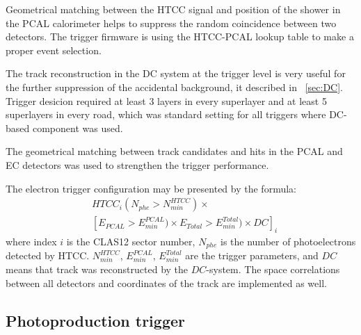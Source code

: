 Geometrical matching between the HTCC signal and position of the shower in the PCAL calorimeter helps to suppress the
random coincidence between two detectors. The trigger firmware is using the HTCC-PCAL lookup table to make a proper event selection.   

The track reconstruction in the DC system at the trigger level is very useful for the further suppression of the accidental background, it described in ~\ref{sec:DC}. Trigger desicion required at least 3 layers in every superlayer and at least 5 superlayers in every road, which was standard setting for all triggers where DC-based component was used.

The geometrical matching between track candidates and hits in the PCAL and EC detectors was used to strengthen the trigger performance.

The electron trigger configuration may be presented by the formula:
\begin{align*} 
 &HTCC_i(N_{phe}{>}N^{HTCC}_{min})\times\\
 & [E_{PCAL}{>}E^{PCAL}_{min})\times E_{Total}{>}E^{Total}_{min})\times  DC]_i
\end{align*}
\noindent
where index $i$ is the CLAS12 sector number, $N_{phe}$ is the number of photoelectrons detected by HTCC.  $N^{HTCC}_{min}$, 
$E^{PCAL}_{min}$, $ E^{Total}_{min}$ are the trigger parameters, and $DC$ means that  track was reconstructed by the $DC$-system. The space correlations between all detectors and coordinates of the track are implemented as well.


\subsection{Photoproduction trigger}
\label{sec:photoproduction_trigger}

